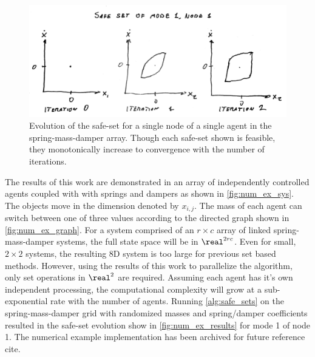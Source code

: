 \begin{figure}[t]
\centering
\includegraphics[width=\columnwidth]{./figures/num_ex_results}
\caption{Evolution of the safe-set for a single node of a single agent in the spring-mass-damper array. Though each safe-set shown is feasible, they monotonically increase to convergence with the number of iterations.}
\label{fig:num_ex_results}
\end{figure}

The results of this work are demonstrated in an array of independently controlled agents coupled with with springs and dampers as shown in \autoref{fig:num_ex_sys}. The objects move in the dimension denoted by $x_{i,j}$. The mass of each agent can switch between one of three values according to the directed graph shown in \autoref{fig:num_ex_graph}. For a system comprised of an $r\times c$ array of linked spring-mass-damper systems, the full state space will be in $\real^{2rc}$. Even for small, $2\times 2$ systems, the resulting 8D system is too large for previous set based methods. However, using the results of this work to parallelize the algorithm, only set operations in $\real^2$ are required. Assuming each agent has it's own independent processing, the computational complexity will grow at a sub-exponential rate with the number of agents. Running \autoref{alg:safe_sets} on the spring-mass-damper grid with randomized masses and spring/damper coefficients resulted in the safe-set evolution show in \autoref{fig:num_ex_results} for mode 1 of node 1. The numerical example implementation has been archived for future reference \alert{cite}. 